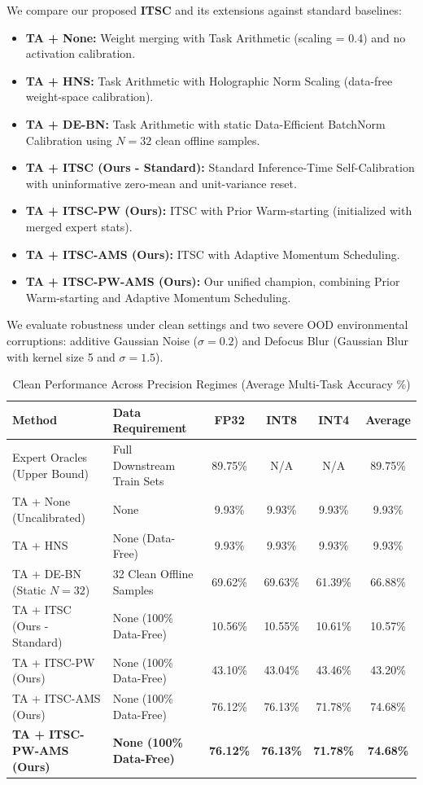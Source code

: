\documentclass{article}
\theoremstyle{plain}
\theoremstyle{definition}
\theoremstyle{remark}
\begin{document}
We compare our proposed \textbf{ITSC} and its extensions against standard baselines:
\begin{itemize}
  \item \textbf{TA + None:} Weight merging with Task Arithmetic (scaling = 0.4) and no activation calibration.
  \item \textbf{TA + HNS:} Task Arithmetic with Holographic Norm Scaling (data-free weight-space calibration).
  \item \textbf{TA + DE-BN:} Task Arithmetic with static Data-Efficient BatchNorm Calibration using $N=32$ clean offline samples.
  \item \textbf{TA + ITSC (Ours - Standard):} Standard Inference-Time Self-Calibration with uninformative zero-mean and unit-variance reset.
  \item \textbf{TA + ITSC-PW (Ours):} ITSC with Prior Warm-starting (initialized with merged expert stats).
  \item \textbf{TA + ITSC-AMS (Ours):} ITSC with Adaptive Momentum Scheduling.
  \item \textbf{TA + ITSC-PW-AMS (Ours):} Our unified champion, combining Prior Warm-starting and Adaptive Momentum Scheduling.
\end{itemize}

We evaluate robustness under clean settings and two severe OOD environmental corruptions: additive Gaussian Noise ($\sigma = 0.2$) and Defocus Blur (Gaussian Blur with kernel size 5 and $\sigma = 1.5$). 

\begin{table}[t]
  \caption{Clean Performance Across Precision Regimes (Average Multi-Task Accuracy \%)}
  \label{tab:clean_results}
  \centering
  \begin{tabular}{llcccc}
    \toprule
    \textbf{Method} & \textbf{Data Requirement} & \textbf{FP32} & \textbf{INT8} & \textbf{INT4} & \textbf{Average} \\
    \midrule
    Expert Oracles (Upper Bound) & Full Downstream Train Sets & 89.75\% & N/A & N/A & 89.75\% \\
    \midrule
    TA + None (Uncalibrated) & None & 9.93\% & 9.93\% & 9.93\% & 9.93\% \\
    TA + HNS & None (Data-Free) & 9.93\% & 9.93\% & 9.93\% & 9.93\% \\
    TA + DE-BN (Static $N=32$) & 32 Clean Offline Samples & 69.62\% & 69.63\% & 61.39\% & 66.88\% \\
    \midrule
    TA + ITSC (Ours - Standard) & None (100\% Data-Free) & 10.56\% & 10.55\% & 10.61\% & 10.57\% \\
    TA + ITSC-PW (Ours) & None (100\% Data-Free) & 43.10\% & 43.04\% & 43.46\% & 43.20\% \\
    TA + ITSC-AMS (Ours) & None (100\% Data-Free) & 76.12\% & 76.13\% & 71.78\% & 74.68\% \\
    \textbf{TA + ITSC-PW-AMS (Ours)} & \textbf{None (100\% Data-Free)} & \textbf{76.12\%} & \textbf{76.13\%} & \textbf{71.78\%} & \textbf{74.68\%} \\
    \bottomrule
  \end{tabular}
\end{table}
\end{document}
